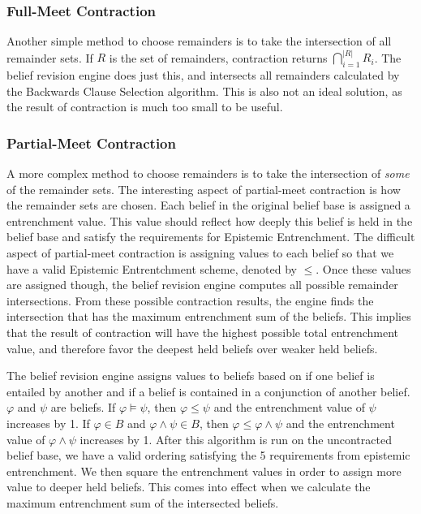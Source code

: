 \documentclass[a4paper,10pt]{article}
\newcommand{\norm}[1]{\lvert #1 \rvert}
\begin{document}
\subsubsection{Full-Meet Contraction}
\label{subsubsec:fullmeet}
Another simple method to choose remainders is to take the intersection of all remainder sets. If $R$ is the set of remainders, contraction returns $\bigcap\limits_{i=1}^{\norm{R}} R_i$. The belief revision engine does just this, and intersects all remainders calculated by the Backwards Clause Selection algorithm. This is also not an ideal solution, as the result of contraction is much too small to be useful.

\subsubsection{Partial-Meet Contraction}
\label{subsubsec:partialmeet}
A more complex method to choose remainders is to take the intersection of \textit{some} of the remainder sets. The interesting aspect of partial-meet contraction is how the remainder sets are chosen. Each belief in the original belief base is assigned a entrenchment value. This value should reflect how deeply this belief is held in the belief base and satisfy the requirements for Epistemic Entrenchment. The difficult aspect of partial-meet contraction is assigning values to each belief so that we have a valid Epistemic Entrentchment scheme, denoted by $\leq$. Once these values are assigned though, the belief revision engine computes all possible remainder intersections. From these possible contraction results, the engine finds the intersection that has the maximum entrenchment sum of the beliefs. This implies that the result of contraction will have the highest possible total entrenchment value, and therefore favor the deepest held beliefs over weaker held beliefs.

The belief revision engine assigns values to beliefs based on if one belief is entailed by another and if a belief is contained in a conjunction of another belief. $\varphi$ and $\psi$ are beliefs. If $\varphi \models \psi$, then $\varphi \leq \psi$ and the entrenchment value of $\psi$ increases by 1. If $\varphi \in B$ and $\varphi\wedge\psi \in B$, then $\varphi\leq\varphi\wedge\psi$ and the entrenchment value of $\varphi\wedge\psi$ increases by 1. After this algorithm is run on the uncontracted belief base, we have a valid ordering satisfying the 5 requirements from epistemic entrenchment. We then square the entrenchment values in order to assign more value to deeper held beliefs. This comes into effect when we calculate the maximum entrenchment sum of the intersected beliefs.
\end{document}
